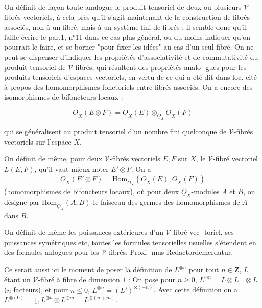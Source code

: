 On définit de façon toute analogue le produit tensoriel de deux ou
plusieurs $\mathcal{V}$-fibrés vectoriels, à cela près qu'il s'agit maintenant de
la construction de fibrés associés, non à un fibré, mais à un système
fini de fibrés ; il semble donc qu'il faille écrire le par.1, n°11 dans
ce cas plus général, ou du moins indiquer qu'on pourrait le faire, et
se borner "pour fixer les idées" au cas d'un seul fibré. On ne peut se
dispenser d'indiquer les propriétés d'associativité et de commutativité
du produit tensoriel de $\mathcal{V}$-fibrés, qui résultent des propriétés analo-
gues pour les produits tensoriels d'espaces vectoriels, en vertu de ce
qui a été dit dans loc. cité à propos des homomorphismes fonctoriels
entre fibrés associés. On a encore des isomorphismes de bifoncteurs
locaux :

\[
\underline{O}_X(E \otimes F) = \underline{O}_X(E) \otimes_{\underline{O}_X} \underline{O}_X(F)
\]

\newpage



qui se généralisent au produit tensoriel d'un nombre fini quelconque
de $\mathcal{V}$-fibrés vectoriels sur l'espace $X$.

On définit de même, pour deux $\mathcal{V}$-fibrés vectoriels $E,F$ sur $X$, le
$\mathcal{V}$-fibré vectoriel $L(E,F)$, qu'il vaut mieux noter $E' \otimes F$. On a
$$ \underline{O}_X(E' \otimes F) = \underline{\mathrm{Hom}}_{\underline{O}_X} (\underline{O}_X(E), \underline{O}_X(F)) $$
(homomorphismes de bifoncteurs locaux), où pour deux $\underline{O}_X$-modules $A$ et $B$,
on désigne par $\underline{\mathrm{Hom}}_{\underline{O}_X}(A,B)$ le faisceau des germes des homomorphismes de
$A$ dans $B$.

On définit de même les puissances extérieures d'un $\mathcal{V}$-fibré vec-
toriel, ses puissances symétriques etc, toutes les formules tensorielles
usuelles s'étendent en des formules anlogues pour les $\mathcal{V}$-fibrés. Proxi-
mus Redactordemerdatur.

Ce serait aussi ici le moment de poser la définition de $L^{\otimes n}$ pour
tout $n \in \mathbf{Z}$, $L$ étant un $\mathcal{V}$-fibré à fibre de dimension $1$ : On pose pour
$n \geqslant 0$, $L^{\otimes n} = L \otimes L \dots \otimes L$ ($n$ facteurs), et pour $n \leqslant 0$, $L^{\otimes n} = (L')^{\otimes (-n)}$.
Avec cette définition on a $L^{\otimes (0)} = \underline{1} , L^{\otimes n} \otimes L^{\otimes m} = L^{\otimes (n+m)}$.

